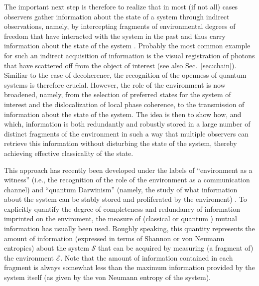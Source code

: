 \documentclass[twocolumn,aps,floatfix,amsmath,amssymb,showpacs,nofootinbib]{revtex4}
\begin{document}
The important next step is therefore to realize that in most (if not
all) cases observers gather information about the state of a system
through indirect observations, namely, by intercepting fragments of
environmental degrees of freedom that have interacted with the system
in the past and thus carry information about the state of the system
\cite{Zurek:1993:pu,Zurek:1998:re,Zurek:2000:tr,Zurek:2002:ii}.
Probably the most common example for such an indirect acquisition of
information is the visual registration of photons that have scattered
off from the object of interest (see also Sec.~\ref{sec:chain}).
Similiar to the case of decoherence, the recognition of the openness
of quantum systems is therefore crucial.  However, the role of the
environment is now broadened, namely, from the selection of preferred
states for the system of interest and the dislocalization of local
phase coherence, to the transmission of information about the state of
the system. The idea is then to show how, and which, information is both
redundantly and robustly stored in a large number of distinct
fragments of the environment in such a way that multiple observers can
retrieve this information without disturbing the state of the system,
thereby achieving effective classicality of the state. 

This approach has recently been developed under the labels of
``environment as a witness'' (i.e., the recognition of the role of the
environment as a communication channel) and ``quantum Darwinism''
(namely, the study of what information about the system can be stably
stored and proliferated by the enviroment)
\cite{Zurek:1993:pu,Zurek:1998:re,Zurek:2002:ii,Zurek:2003:pl,Ollivier:2003:za,%
  Ollivier:2004:im,Blume:2004:oo,Blume:2005:oo}.  To explicitly
quantify the degree of completeness and redundancy of information
imprinted on the enviroment, the measure of (classical
\cite{Ollivier:2003:za,Ollivier:2004:im} or quantum
\cite{Zurek:2002:ii,Blume:2004:oo,Blume:2005:oo}) mutual information
has usually been used.  Roughly speaking, this quantity represents the
amount of information (expressed in terms of Shannon or von Neumann
entropies) about the system $\mathcal{S}$ that can be acquired by
measuring (a fragment of) the environment $\mathcal{E}$.  Note that
the amount of information contained in each fragment is always
somewhat less \cite{Blume:2005:oo} than the maximum information
provided by the system itself (as given by the von Neumann entropy of
the system).
\end{document}

